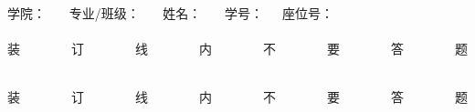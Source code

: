 \newcommand{\makepartnoteq}[3]{%
	\stepcounter{dati}%
	\ifthenelse{\boolean{printanswers}}
	{
		\noindent\textbf{\zihao{-4}\songti\zhnum{dati}、#1（本大题共~#2~小题，共~#3~分）}
	}
	{\noindent\hspace{-0.4cm}\begin{minipage}{16cm}
			\parpic[l]{
				\noindent
				\setlength{\tabcolsep}{2.8mm}
				\renewcommand\arraystretch{1.1}
				\begin{tabular}{|c|c|c|}
					\hline \raisebox{-4pt}{得分} & \raisebox{-4pt}{评卷人} & \raisebox{-4pt}{复查人} \\[2mm]
					\hline                       &                         &                         \\[2mm]
					\hline
				\end{tabular}
			}
			\noindent\textbf{\zihao{-4}\songti\zhnum{dati}、#1（本大题共~#2~小题，共~#3~分）}
		\end{minipage}\\\\
	}

}
\newsavebox{\zdxa}%
\sbox{\zdxa}
{\parbox{27cm}{\centering {}\songti \hspace{1cm}
		学院：\uline{\makebox[28mm][c]{}}~~~ 专业/班级：\uline{\makebox[28mm][c]{}}~~~ 姓名：\uline{\makebox[28mm][c]{}}~~~ 学号：\uline{\makebox[28mm][c]{}}~~~座位号：\uline{\makebox[10mm][c]{}} \\
		\vspace{-1mm}
		\songti
		\dotfill\\
		\vspace{-1mm}%
		装~~~~~~~~订~~~~~~~~线~~~~~~~~内~~~~~~~~不~~~~~~~~要~~~~~~~~答~~~~~~~~题\\
		\vspace{-3mm}%
		\dotfill
	}
}
\newsavebox{\zdxb}%
\sbox{\zdxb}
{\parbox{27cm}{\centering%
		\songti
		\dotfill\\
		\vspace{-1mm}%
		装~~~~~~~~订~~~~~~~~线~~~~~~~~内~~~~~~~~不~~~~~~~~要~~~~~~~~答~~~~~~~~题\\
		\vspace{-3mm}%
		\dotfill
	}
}
\newcommand{\putzdx}{%
	\hspace{-20mm}\parbox{1cm}{
		\rotatebox[origin=c]{90}{
			\usebox{\zdxa}
		}}
}
